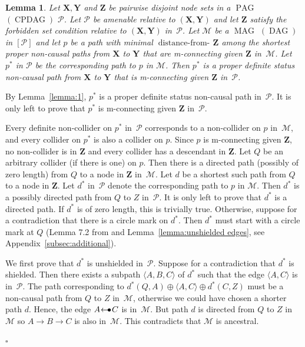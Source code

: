 \documentclass[11pt,a4paper]{article}
\newtheorem{lemma}[definition]{Lemma}
\newenvironment{proofof}[1][]{\begin{trivlist}
   \item[\hskip \labelsep {\bfseries Proof of #1.}]}{\hfill{}$\square$\end{trivlist}}
\DeclareMathOperator{\CPDAG}{CPDAG}
\DeclareMathOperator{\DAG}{DAG}
\DeclareMathOperator{\MAG}{MAG}
\DeclareMathOperator{\PAG}{PAG}
\DeclareMathOperator{\distancefrom}{distance-from-\!}
\newcommand{\forb}{the forbidden set condition\xspace}
\newcommand{\g}[1][G]{\mathcal{#1}}
\newcommand{\pstar}[1][p]{{#1}^{*}}
\newcommand{\arrowbullet}{
  \setlength{\unitlength}{1mm}
  \begin{picture}(5,1)(0,0)
    \put(0.2,0){$\leftarrow$}
    \put(3,0){$\bullet$}
  \end{picture}
}
\begin{document}
\begin{lemma}
  Let $\mathbf{X,Y}$ and $\mathbf{Z}$ be pairwise disjoint node sets in a $\PAG$ $(\CPDAG)$ $\g[P]$.  Let $\g[P]$ be amenable relative to $(\mathbf{X,Y})$ and let $\mathbf{Z}$ satisfy \forb{} relative to $(\mathbf{X},\mathbf{Y})$ in~$\g[P]$. Let $\g[M]$ be a $\MAG$ $(\DAG)$ in $[\g[P]]$ and let $p$ be a path with minimal $\distancefrom{\mathbf{Z}}$ among the shortest proper non-causal paths from $\mathbf{X}$ to $\mathbf{Y}$ that are m-connecting given $\mathbf{Z}$ in~$\g[M]$. Let $\pstar$ in $\g[P]$ be the corresponding path to $p$ in $\g[M]$. Then $\pstar$ is a proper definite status non-causal path from $\mathbf{X}$ to $\mathbf{Y}$ that is m-connecting given $\mathbf{Z}$ in~$\g[P]$.
   \label{lemma:2}
\end{lemma}

 \begin{proofof}[Lemma~\ref{lemma:2}]
By Lemma~\ref{lemma:1}, $\pstar$ is a proper definite status non-causal path in~$\g[P]$. It is only left to prove that $\pstar$ is m-connecting given $\mathbf{Z}$ in~$\g[P]$.

Every definite non-collider on $\pstar$ in~$\g[P]$ corresponds to a non-collider on $p$ in~$\g[M]$, and every collider on $\pstar$ is also a collider on $p$. Since $p$ is m-connecting given $\mathbf{Z}$, no non-collider is in $\mathbf{Z}$ and every collider has a descendant in $\mathbf{Z}$. Let $Q$ be an arbitrary collider (if there is one) on $p$. Then there is a directed path (possibly of zero length) from $Q$ to a node in $\mathbf{Z}$ in~$\g[M]$. Let $d$ be a shortest such path from $Q$ to a node in $\mathbf{Z}$. Let $\pstar[d]$ in~$\g[P]$ denote the corresponding path to $p$ in $\g[M]$. Then $\pstar[d]$ is a possibly directed path from $Q$ to $Z$ in~$\g[P]$.  It is only left to prove that $\pstar[d]$ is a directed path. If $\pstar[d]$ is of zero length, this is trivially true. Otherwise, suppose for a contradiction that there is a circle mark on $\pstar[d]$. Then $\pstar[d]$ must start with a circle mark at $Q$ (Lemma 7.2 from \citet{maathuis2013generalized} and Lemma~\ref{lemma:unshielded edges}, see Appendix~\ref{subsec:additional}).

We first prove that $\pstar[d]$ is unshielded in~$\g[P]$. Suppose for a contradiction that $\pstar[d]$ is shielded. Then there exists a subpath $\langle A,B,C \rangle$ of $\pstar[d]$ such that the edge $\langle A, C \rangle $ is in~$\g[P]$. The path corresponding to $\pstar[d](Q,A) \oplus \langle A, C \rangle \oplus \pstar[d](C,Z)$ must be a non-causal path from $Q$ to $Z$ in~$\g[M]$, otherwise we could have chosen a shorter path $d$. Hence, the edge $A \arrowbullet C$ is in~$\g[M]$. But path $d$ is directed from $Q$ to $Z$ in~$\g[M]$ so $A \rightarrow B \rightarrow C$ is also in~$\g[M]$. This contradicts that $\g[M]$ is ancestral.


\end{proofof}
\end{document}
